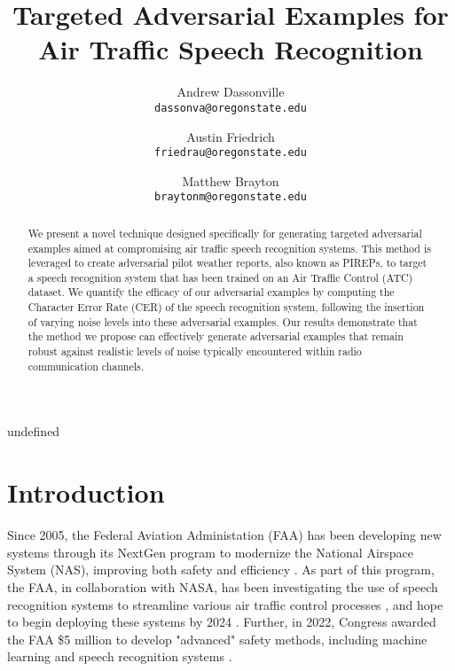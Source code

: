 undefined


\title{Targeted Adversarial Examples for Air Traffic Speech Recognition}

\author{
  Andrew Dassonville\\
  \texttt{dassonva@oregonstate.edu}
  \and
  Austin Friedrich\\
  \texttt{friedrau@oregonstate.edu}
  \and
  Matthew Brayton\\
  \texttt{braytonm@oregonstate.edu}
}

\maketitle

\thispagestyle{firstpage}

\begin{abstract}
  We present a novel technique designed specifically for generating targeted
  adversarial examples aimed at compromising air traffic speech recognition
  systems. This method is leveraged to create adversarial pilot weather reports,
  also known as PIREPs, to target a speech recognition system that has been
  trained on an Air Traffic Control (ATC) dataset. We quantify the efficacy of
  our adversarial examples by computing the Character Error Rate (CER) of the
  speech recognition system, following the insertion of varying noise levels
  into these adversarial examples. Our results demonstrate that the method we
  propose can effectively generate adversarial examples that remain robust
  against realistic levels of noise typically encountered within radio
  communication channels.
\end{abstract}

\section{Introduction}

Since 2005, the Federal Aviation Administation (FAA) has been developing new
systems through its NextGen program to modernize the National Airspace System
(NAS), improving both safety and efficiency \cite{web:faa_nextgen}. As part of
this program, the FAA, in collaboration with NASA, has been investigating the
use of speech recognition systems to streamline various air traffic control
processes \cite{nasa-2016-speech-recognition}, and hope to begin deploying these
systems by 2024 \cite{faa-2022-nextgen}. Further, in 2022, Congress awarded the
FAA \$5 million to develop "advanced" safety methods, including machine learning
and speech recognition systems \cite{faa-2022-budget}.

